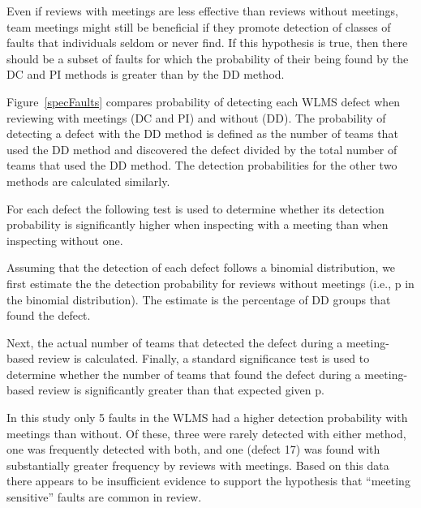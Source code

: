 Even if reviews with meetings are less effective than
reviews without meetings, team meetings might still be beneficial if
they promote detection of classes of faults that individuals seldom
or never find.  If this hypothesis is true, then there should be a subset of
faults for which the probability of their being found by
the DC and PI methods is greater than by the  DD method.

Figure~\ref{specFaults} compares probability of detecting each 
WLMS defect when reviewing with meetings (DC and PI) and 
without (DD).  The probability of detecting a defect with the DD 
method is defined  as the number of teams that used the DD method 
and discovered the defect divided by the total number of teams 
that used the DD method.  The detection probabilities for the 
other two methods are calculated similarly. 

For each defect the following test is used to determine whether
its detection probability is significantly higher when inspecting 
with a meeting than when inspecting without one. 

Assuming that the detection of each defect follows a binomial
distribution, we first estimate the the detection probability 
for reviews without meetings (i.e., p in the binomial distribution). 
The estimate is the percentage of DD groups that found the defect. 

Next, the actual number of teams that detected the defect during 
a meeting-based review is calculated. Finally, a standard significance 
test is used to determine whether the number of teams that found the
defect during a meeting-based review is significantly
greater than that expected given p.

In this study only 5 faults in the WLMS had a higher detection 
probability with meetings than without. Of these, three were rarely detected 
with either method, one was frequently detected with both, and one (defect 17) 
was found with substantially greater frequency by reviews with meetings. 
Based on this data there appears to be insufficient evidence to support the 
hypothesis that ``meeting sensitive'' faults are common in review.




